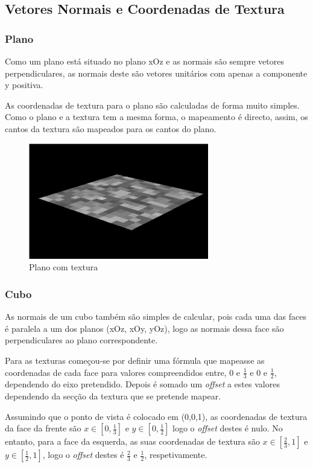 \documentclass[a4paper]{article}
\begin{document}
\subsection{Vetores Normais e Coordenadas de Textura}

\subsubsection{Plano}
Como um plano está situado no plano xOz e as normais são sempre vetores
perpendiculares, as normais deste são vetores unitários com apenas a componente
y positiva.

As coordenadas de textura para o plano são calculadas de forma
muito simples. Como o plano e a textura tem a mesma forma, o mapeamento é
directo, assim, os cantos da textura são mapeados para os cantos do plano.

\begin{figure}[H]
    \centering
    \includegraphics[width=0.7\textwidth]{plane.png}
    \caption{Plano com textura}
\end{figure}

\subsubsection{Cubo}
As normais de um cubo também são simples de calcular, pois cada uma das faces é
paralela a um dos planos (xOz, xOy, yOz), logo as normais dessa face são
perpendiculares ao plano correspondente.

Para as texturas começou-se por definir uma fórmula que mapeasse as coordenadas
de cada face para valores compreendidos entre, 0 e $\frac{1}{3}$ e 0 e
$\frac{1}{2}$, dependendo do eixo pretendido. Depois é somado um
\textit{offset} a estes valores dependendo da secção da textura que se pretende
mapear.

Assumindo que o ponto de vista é colocado em (0,0,1), as coordenadas de textura
da face da frente são $x \in [0,\frac{1}{3}]$ e $y \in [0,\frac{1}{2}]$ logo o
\textit{offset} destes é nulo. No entanto, para a face da esquerda, as suas
coordenadas de textura são $x \in [\frac{2}{3},1]$ e $y \in [\frac{1}{2},1]$,
logo o \textit{offset} destes é $\frac{2}{3}$ e $\frac{1}{2}$, respetivamente.
\end{document}
